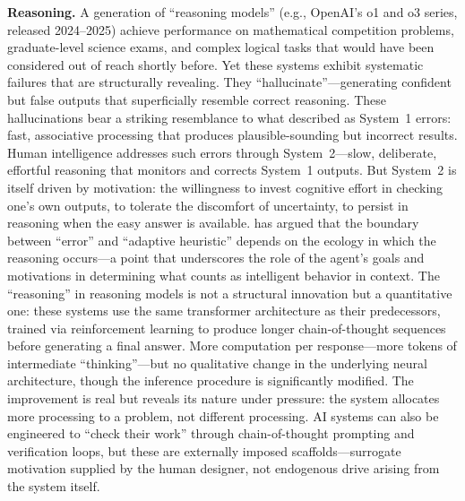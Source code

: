 \documentclass[12pt,a4paper]{article}
\begin{document}
\textbf{Reasoning.} A generation of ``reasoning models'' (e.g., OpenAI's o1 and o3 series, released 2024--2025) achieve performance on mathematical competition problems, graduate-level science exams, and complex logical tasks that would have been considered out of reach shortly before. Yet these systems exhibit systematic failures that are structurally revealing. They ``hallucinate''---\hspace{0pt}generating confident but false outputs that superficially resemble correct reasoning. These hallucinations bear a striking resemblance to what \citet{Kahneman2011} described as System~1 errors: fast, associative processing that produces plausible-sounding but incorrect results. Human intelligence addresses such errors through System~2---\hspace{0pt}slow, deliberate, effortful reasoning that monitors and corrects System~1 outputs. But System~2 is itself driven by motivation: the willingness to invest cognitive effort in checking one's own outputs, to tolerate the discomfort of uncertainty, to persist in reasoning when the easy answer is available. \citet{Gigerenzer2007} has argued that the boundary between ``error'' and ``adaptive heuristic'' depends on the ecology in which the reasoning occurs---\hspace{0pt}a point that underscores the role of the agent's goals and motivations in determining what counts as intelligent behavior in context. The ``reasoning'' in reasoning models is not a structural innovation but a quantitative one: these systems use the same transformer architecture as their predecessors, trained via reinforcement learning to produce longer chain-of-thought sequences before generating a final answer. More computation per response---\hspace{0pt}more tokens of intermediate ``thinking''---\hspace{0pt}but no qualitative change in the underlying neural architecture, though the inference procedure is significantly modified. The improvement is real but reveals its nature under pressure: the system allocates more processing to a problem, not different processing. AI systems can also be engineered to ``check their work'' through chain-of-thought prompting and verification loops, but these are externally imposed scaffolds---\hspace{0pt}surrogate motivation supplied by the human designer, not endogenous drive arising from the system itself.
\end{document}
